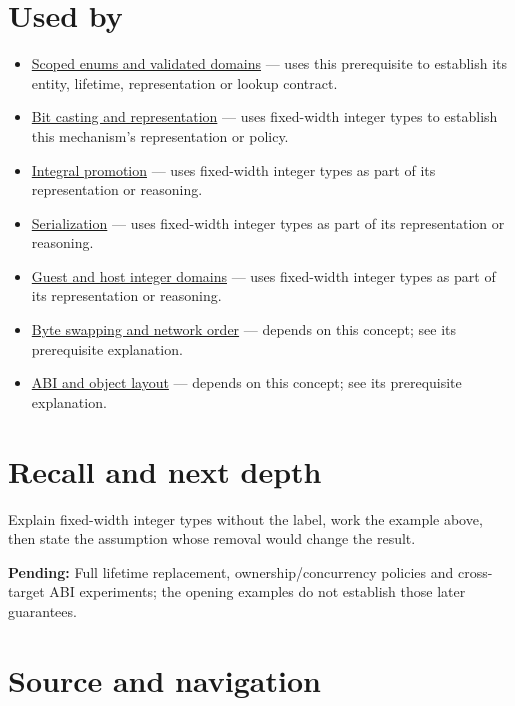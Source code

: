 \section{Used by}\label{appendix-cc04044b5782-used-by}

\begin{itemize}
\tightlist
\item
  \hyperref[appendix-23640fcee147]{Scoped enums and validated domains} --- uses this prerequisite to establish its entity, lifetime, representation or lookup contract.
\item
  \hyperref[appendix-34ee45f161c1]{Bit casting and representation} --- uses fixed-width integer types to establish this mechanism's representation or policy.
\item
  \hyperref[appendix-45303d03796a]{Integral promotion} --- uses fixed-width integer types as part of its representation or reasoning.
\item
  \hyperref[appendix-91d09ebed979]{Serialization} --- uses fixed-width integer types as part of its representation or reasoning.
\item
  \hyperref[appendix-33e7a011b684]{Guest and host integer domains} --- uses fixed-width integer types as part of its representation or reasoning.
\item
  \hyperref[appendix-11ba36693aa2]{Byte swapping and network order} --- depends on this concept; see its prerequisite explanation.
\item
  \hyperref[appendix-c4ac6bb0fff8]{ABI and object layout} --- depends on this concept; see its prerequisite explanation.
\end{itemize}

\section{Recall and next depth}\label{appendix-cc04044b5782-recall-and-next-depth}

Explain fixed-width integer types without the label, work the example above, then state the assumption whose removal would change the result.

\textbf{Pending:} Full lifetime replacement, ownership/concurrency policies and cross-target ABI experiments; the opening examples do not establish those later guarantees.

\section{Source and navigation}\label{appendix-cc04044b5782-source-and-navigation}

